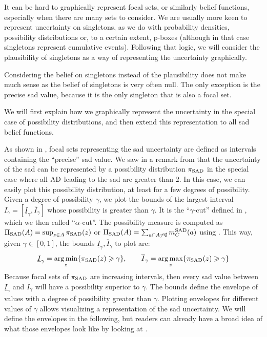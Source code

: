 It can be hard to graphically represent focal sets, or similarly belief functions, especially when there are many sets to consider. We are usually more keen to represent uncertainty on singletons, as we do with probability densities, possibility distributions or, to a certain extent, p-boxes (although in that case singletons represent cumulative events). Following that logic, we will consider the plausibility of singletons as a way of representing the uncertainty graphically.
\begin{remark}
    Considering the belief on singletons instead of the plausibility does not make much sense as the belief of singletons is very often null. The only exception is the precise \acrshort{sad} value, because it is the only singleton that is also a focal set.
\end{remark}
We will first explain how we graphically represent the uncertainty in the special case of possibility distributions, and then extend this representation to all \acrshort{sad} belief functions. 

As shown in , focal sets representing the \acrshort{sad} uncertainty are defined as intervals containing the ``precise'' \acrshort{sad} value. We saw in a remark from  that the uncertainty of the \acrshort{sad} can be represented by a possibility distribution $\pi_{\mathrm{SAD}}$ in the special case where all $\mathrm{AD}$ leading to the \acrshort{sad} are greater than $2$. In this case, we can easily plot this possibility distribution, at least for a few degrees of possibility. Given a degree of possibility $\gamma$, we plot the bounds of the largest interval $I_\gamma=[\underline{I}_\gamma, \overline{I}_\gamma]$ whose possibility is greater than $\gamma$. It is the ``$\gamma$-cut'' defined in , which we then called ``$\alpha$-cut''. The possibility measure is computed as $\Pi_{\mathrm{SAD}}(A)=\sup_{z\in A}\pi_{\mathrm{SAD}}(z)$ or $\Pi_{\mathrm{SAD}}(A)=\sum_{a\cap A\neq\emptyset}m^{\mathrm{SAD}}_C(a)$ using . This way, given $\gamma\in[0,1]$, the bounds $\underline{I}_\gamma, \overline{I}_\gamma$ to plot are:
\begin{align}\label{eq:possibility_bounds}
    \underline{I}_\gamma = \operatorname*{arg\,min}_{z}\{\pi_{\mathrm{SAD}}(z)\geqslant\gamma\}, \qquad \overline{I}_\gamma = \operatorname*{arg\,max}_{z}\{\pi_{\mathrm{SAD}}(z)\geqslant\gamma\}
\end{align}
Because focal sets of $\pi_{\mathrm{SAD}}$ are increasing intervals, then every \acrshort{sad} value between $\underline{I}_\gamma$ and $\overline{I}_\gamma$ will have a possibility superior to $\gamma$. The bounds define the envelope of values with a degree of possibility greater than $\gamma$. Plotting envelopes for different values of $\gamma$ allows visualizing a representation of the \acrshort{sad} uncertainty. We will define the envelopes in the following, but readers can already have a broad idea of what those envelopes look like by looking at . 


